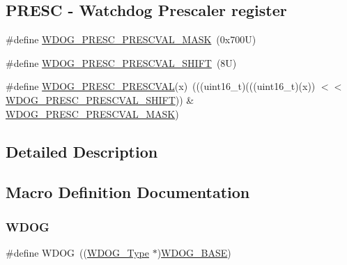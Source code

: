 \subsection*{P\+R\+E\+SC -\/ Watchdog Prescaler register}
\begin{DoxyCompactItemize}
\item 
\#define \mbox{\hyperlink{group___w_d_o_g___register___masks_gaeadae4c65653a3302e69526730af1596}{W\+D\+O\+G\+\_\+\+P\+R\+E\+S\+C\+\_\+\+P\+R\+E\+S\+C\+V\+A\+L\+\_\+\+M\+A\+SK}}~(0x700\+U)
\item 
\#define \mbox{\hyperlink{group___w_d_o_g___register___masks_gaa93b6acb20a8e20b687f05b8ced452c1}{W\+D\+O\+G\+\_\+\+P\+R\+E\+S\+C\+\_\+\+P\+R\+E\+S\+C\+V\+A\+L\+\_\+\+S\+H\+I\+FT}}~(8\+U)
\item 
\#define \mbox{\hyperlink{group___w_d_o_g___register___masks_ga13265fa90a567f7d142cd9cf3a5c0118}{W\+D\+O\+G\+\_\+\+P\+R\+E\+S\+C\+\_\+\+P\+R\+E\+S\+C\+V\+AL}}(x)~(((uint16\+\_\+t)(((uint16\+\_\+t)(x)) $<$$<$ \mbox{\hyperlink{group___w_d_o_g___register___masks_gaa93b6acb20a8e20b687f05b8ced452c1}{W\+D\+O\+G\+\_\+\+P\+R\+E\+S\+C\+\_\+\+P\+R\+E\+S\+C\+V\+A\+L\+\_\+\+S\+H\+I\+FT}})) \& \mbox{\hyperlink{group___w_d_o_g___register___masks_gaeadae4c65653a3302e69526730af1596}{W\+D\+O\+G\+\_\+\+P\+R\+E\+S\+C\+\_\+\+P\+R\+E\+S\+C\+V\+A\+L\+\_\+\+M\+A\+SK}})
\end{DoxyCompactItemize}


\subsection{Detailed Description}


\subsection{Macro Definition Documentation}
\mbox{\label{group___w_d_o_g___register___masks_gab938901a5fa5443253fc293ebd0399e3}} 
\subsubsection{\texorpdfstring{W\+D\+OG}{WDOG}}
{\footnotesize\ttfamily \#define W\+D\+OG~((\mbox{\hyperlink{struct_w_d_o_g___type}{W\+D\+O\+G\+\_\+\+Type}} $\ast$)\mbox{\hyperlink{group___w_d_o_g___register___masks_ga0c092d77d4599871d1ebda1a3a28e887}{W\+D\+O\+G\+\_\+\+B\+A\+SE}})}

